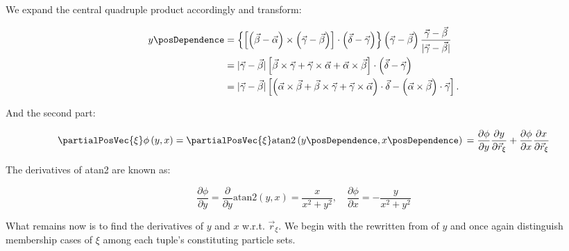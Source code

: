 We expand the central quadruple product accordingly and transform:

\begin{align}
  y\posDependence &= \left\{
      \left[
        \left(\vec{\beta} - \vec{\alpha}\right) 
        \times \left(\vec{\gamma} - \vec{\beta}\right)
      \right]\cdot\left(\vec{\delta} - \vec{\gamma}\right)
    \right\} \left(\vec{\gamma} - \vec{\beta}\right)\frac{
    \vec{\gamma} - \vec{\beta}
    }{
      \lvert\vec{\gamma} - \vec{\beta}\rvert
    }\\
  &= \lvert\vec{\gamma} - \vec{\beta}\rvert 
    \left[
      \vec{\beta} \times \vec{\gamma} 
      + \vec{\gamma} \times \vec{\alpha}
      + \vec{\alpha} \times \vec{\beta}
    \right] \cdot \left(\vec{\delta} - \vec{\gamma}\right)\\
  &= \lvert\vec{\gamma} - \vec{\beta}\rvert 
    \left[
      \left(
        \vec{\alpha} \times \vec{\beta}
        + \vec{\beta} \times \vec{\gamma} 
        + \vec{\gamma} \times \vec{\alpha}
      \right) \cdot \vec{\delta}
      - \left(\vec{\alpha} \times \vec{\beta}\right) \cdot \vec{\gamma}
    \right].
\end{align}


And the second part:

\begin{equation}
  \partialPosVec{\xi}\phi\left(y, x\right) = \partialPosVec{\xi}
    \textrm{atan2}\left(y\posDependence, x\posDependence\right)\\
  = \frac{\partial\phi}{\partial y} \frac{\partial y}{\partial \vec{r}_{\xi}}
    + \frac{\partial\phi}{\partial x} \frac{\partial x}{\partial \vec{r}_{\xi}}
\end{equation}

The derivatives of atan2 are known as:

\begin{equation}
  \frac{\partial\phi}{\partial y} = \frac{\partial}{\partial y} \textrm{atan2}(y,
  x)= \frac{x}{x^2 + y^2}, 
  \quad\frac{\partial\phi}{\partial x} = -\frac{y}{x^2 + y^2}
\end{equation}

What remains now is to find the derivatives of $y$ and $x$ w.r.t.
$\vec{r}_{\xi}$. We begin with the rewritten from of $y$ and once again
distinguish membership cases of $\xi $ among each tuple's constituting particle
sets.

